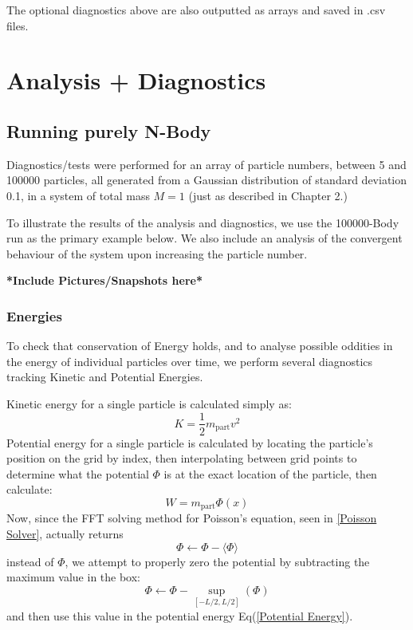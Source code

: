 \documentclass[oneside]{book}
\begin{document}
The optional diagnostics above are also outputted as arrays and saved in .csv files.

\chapter{Analysis + Diagnostics}

\section{Running purely N-Body}
Diagnostics/tests were performed for an array of particle numbers, between 5 and 100000 particles, all generated from a Gaussian distribution of standard deviation 0.1, in a system of total mass $M=1$ (just as described in Chapter 2.)

To illustrate the results of the analysis and diagnostics,  we use the 100000-Body run as the primary example below. We also include an analysis of the convergent behaviour of the system upon increasing the particle number.

{\color{red}\textbf{*Include Pictures/Snapshots here*}}

\subsection{Energies}
To check that conservation of Energy holds, and to analyse possible oddities in the energy of individual particles over time, we perform several diagnostics tracking Kinetic and Potential Energies.

Kinetic energy for a single particle is calculated simply as:
\begin{equation}
    K = \frac{1}{2}m_\text{part} v^2
\end{equation}
Potential energy for a single particle is calculated by locating the particle's position on the grid by index, then interpolating between grid points to determine what the potential $\Phi$ is at the exact location of the particle, then calculate:
\begin{equation}
    W = m_\text{part}\Phi(x)    
    \label{Potential Energy}
\end{equation}
Now, since the FFT solving method for Poisson's equation, seen in \cref{Poisson Solver}, actually returns
$$\Phi \leftarrow \Phi - \langle\Phi\rangle$$
instead of $\Phi$, we attempt to properly zero the potential by subtracting the maximum value in the box:
$$\Phi \leftarrow \Phi - \sup_{[-L/2,L/2]}(\Phi)$$
and then use this value in the potential energy Eq(\ref{Potential Energy}). 
\end{document}
